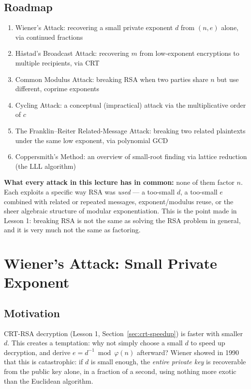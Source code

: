 \vspace{0.5cm}
\subsection*{Roadmap}
\begin{enumerate}[label=(\arabic*)]
\item Wiener's Attack: recovering a small private exponent $d$ from $(n,e)$ alone, via continued fractions
\item Håstad's Broadcast Attack: recovering $m$ from low-exponent encryptions to multiple recipients, via CRT
\item Common Modulus Attack: breaking RSA when two parties share $n$ but use different, coprime exponents
\item Cycling Attack: a conceptual (impractical) attack via the multiplicative order of $c$
\item The Franklin--Reiter Related-Message Attack: breaking two related plaintexts under the same low exponent, via polynomial GCD
\item Coppersmith's Method: an overview of small-root finding via lattice reduction (the LLL algorithm)
\end{enumerate}
\textbf{What every attack in this lecture has in common:} none of them factor $n$. Each exploits a specific way RSA was \emph{used} — a too-small $d$, a too-small $e$ combined with related or repeated messages, exponent/modulus reuse, or the sheer algebraic structure of modular exponentiation. This is the point made in Lesson 1: breaking RSA is not the same as solving the RSA problem in general, and it is very much not the same as factoring.

\newpage
\section{Wiener's Attack: Small Private Exponent}

\subsection{Motivation}
CRT-RSA decryption (Lesson 1, Section~\ref{sec:crt-speedup}) is faster with smaller $d$. This creates a temptation: why not simply choose a small $d$ to speed up decryption, and derive $e = d^{-1} \bmod \varphi(n)$ afterward? Wiener showed in 1990 that this is catastrophic: if $d$ is small enough, the \emph{entire private key} is recoverable from the public key alone, in a fraction of a second, using nothing more exotic than the Euclidean algorithm.

